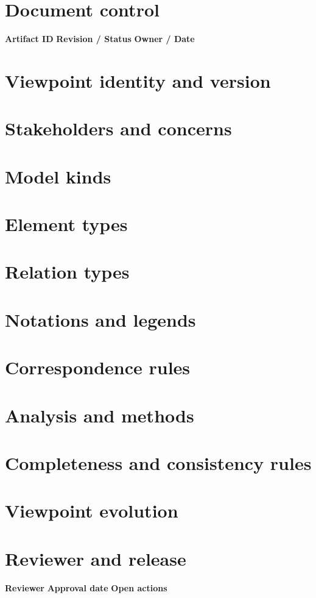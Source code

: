 \documentclass[10pt,letterpaper]{article}
\begin{document}
\DocProvenance
\section{Document control}
\textbf{Artifact ID}
\textbf{Revision / Status}
\textbf{Owner / Date}
\section{Viewpoint identity and version}
\section{Stakeholders and concerns}
\section{Model kinds}
\section{Element types}
\section{Relation types}
\section{Notations and legends}
\section{Correspondence rules}
\section{Analysis and methods}
\section{Completeness and consistency rules}
\section{Viewpoint evolution}
\section{Reviewer and release}
\textbf{Reviewer}
\textbf{Approval date}
\textbf{Open actions}
\end{document}
